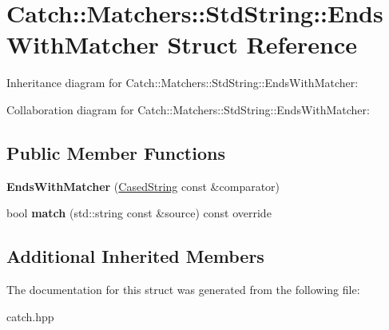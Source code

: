 \hypertarget{structCatch_1_1Matchers_1_1StdString_1_1EndsWithMatcher}{}\section{Catch\+:\+:Matchers\+:\+:Std\+String\+:\+:Ends\+With\+Matcher Struct Reference}
\label{structCatch_1_1Matchers_1_1StdString_1_1EndsWithMatcher}


Inheritance diagram for Catch\+:\+:Matchers\+:\+:Std\+String\+:\+:Ends\+With\+Matcher\+:


Collaboration diagram for Catch\+:\+:Matchers\+:\+:Std\+String\+:\+:Ends\+With\+Matcher\+:
\subsection*{Public Member Functions}
\begin{DoxyCompactItemize}
\item 
\mbox{\label{structCatch_1_1Matchers_1_1StdString_1_1EndsWithMatcher_aa5ec700b4629562f74f362080accfd7b}} 
{\bfseries Ends\+With\+Matcher} (\hyperlink{structCatch_1_1Matchers_1_1StdString_1_1CasedString}{Cased\+String} const \&comparator)
\item 
\mbox{\label{structCatch_1_1Matchers_1_1StdString_1_1EndsWithMatcher_aca2741fa57374a2a98d2a84ac3e13a6d}} 
bool {\bfseries match} (std\+::string const \&source) const override
\end{DoxyCompactItemize}
\subsection*{Additional Inherited Members}


The documentation for this struct was generated from the following file\+:\begin{DoxyCompactItemize}
\item 
catch.\+hpp\end{DoxyCompactItemize}
